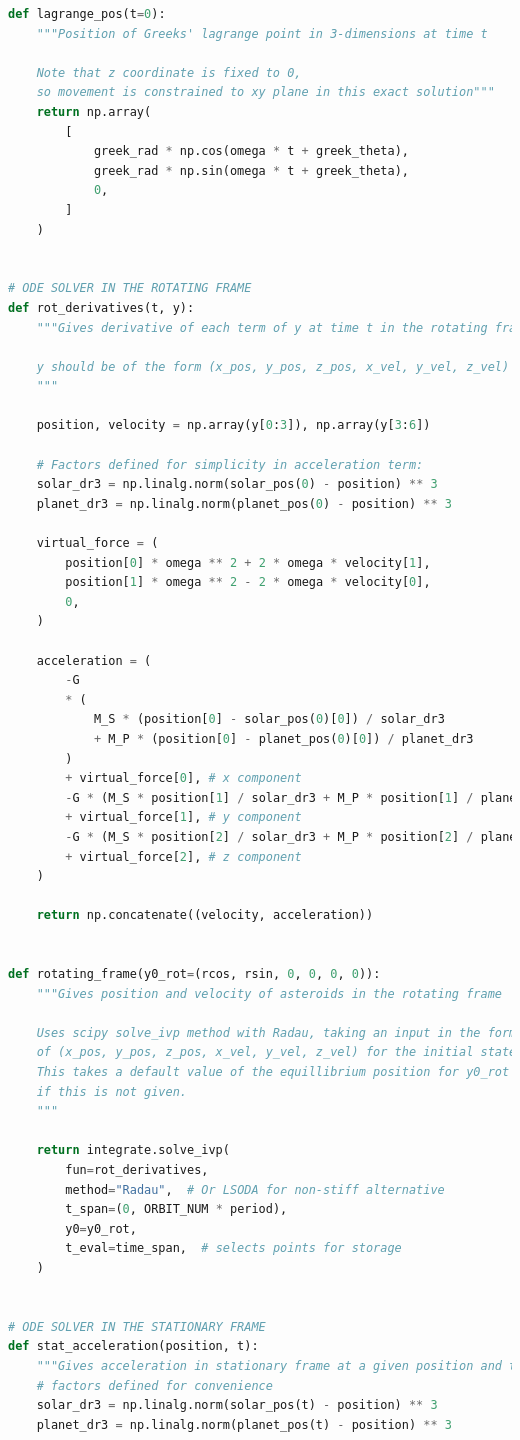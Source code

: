 \documentclass[11pt, a4paper,twocolumn]{article} %
\begin{document}
\begin{appendices}
\begin{lstlisting}[language=Python]
def lagrange_pos(t=0):
	"""Position of Greeks' lagrange point in 3-dimensions at time t
	
	Note that z coordinate is fixed to 0, 
	so movement is constrained to xy plane in this exact solution"""
	return np.array(
		[
			greek_rad * np.cos(omega * t + greek_theta),
			greek_rad * np.sin(omega * t + greek_theta),
			0,
		]
	)


# ODE SOLVER IN THE ROTATING FRAME
def rot_derivatives(t, y):
	"""Gives derivative of each term of y at time t in the rotating frame
	
	y should be of the form (x_pos, y_pos, z_pos, x_vel, y_vel, z_vel)
	"""
	
	position, velocity = np.array(y[0:3]), np.array(y[3:6])
	
	# Factors defined for simplicity in acceleration term:
	solar_dr3 = np.linalg.norm(solar_pos(0) - position) ** 3
	planet_dr3 = np.linalg.norm(planet_pos(0) - position) ** 3
	
	virtual_force = (
		position[0] * omega ** 2 + 2 * omega * velocity[1],
		position[1] * omega ** 2 - 2 * omega * velocity[0],
		0,
	)
	
	acceleration = (
		-G
		* (
			M_S * (position[0] - solar_pos(0)[0]) / solar_dr3
			+ M_P * (position[0] - planet_pos(0)[0]) / planet_dr3
		)
		+ virtual_force[0], # x component 
		-G * (M_S * position[1] / solar_dr3 + M_P * position[1] / planet_dr3)
		+ virtual_force[1], # y component 
		-G * (M_S * position[2] / solar_dr3 + M_P * position[2] / planet_dr3)
		+ virtual_force[2], # z component 
	)
	
	return np.concatenate((velocity, acceleration))


def rotating_frame(y0_rot=(rcos, rsin, 0, 0, 0, 0)):
	"""Gives position and velocity of asteroids in the rotating frame
	
	Uses scipy solve_ivp method with Radau, taking an input in the form
	of (x_pos, y_pos, z_pos, x_vel, y_vel, z_vel) for the initial state.
	This takes a default value of the equillibrium position for y0_rot 
	if this is not given.
	"""
	
	return integrate.solve_ivp(
		fun=rot_derivatives,
		method="Radau",  # Or LSODA for non-stiff alternative
		t_span=(0, ORBIT_NUM * period),
		y0=y0_rot,
		t_eval=time_span,  # selects points for storage
	)


# ODE SOLVER IN THE STATIONARY FRAME
def stat_acceleration(position, t):
	"""Gives acceleration in stationary frame at a given position and time"""
	# factors defined for convenience
	solar_dr3 = np.linalg.norm(solar_pos(t) - position) ** 3
	planet_dr3 = np.linalg.norm(planet_pos(t) - position) ** 3
	

\end{lstlisting}
\end{appendices}
\end{document}
